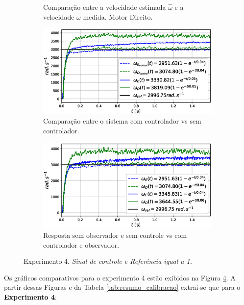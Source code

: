 \begin{figure}[H]
\begin{subfigure}{.5\textwidth}
    \caption{Comparação entre a velocidade estimada $\hat{\omega}$ e a velocidade $\omega$ medida. Motor Direito.}
    \label{fig:exp04:filtragem_direito}
    \end{subfigure}
    \hfill
    \begin{subfigure}{.5\textwidth}
    \centering
    \includegraphics[width=\textwidth]{figuras/resultados/exp04/controlador_vs_sem_controlador100.eps}
    \caption{Comparação entre o sistema com controlador vs sem controlador.}
    \label{fig:exp04:controle}
    \end{subfigure}
    \hfill
    \begin{subfigure}{.5\textwidth}
    \centering
    \includegraphics[width=\textwidth]{figuras/resultados/exp04/antes_vs_depois100.eps}
    \caption{Resposta sem observador e sem controle vs com controlador e observador.}
    \label{fig:exp04:antes_vs_depois}
    \end{subfigure}
    
    \caption{Experimento 4. \emph{Sinal de controle e Referência igual a 1.}}
    \label{fig:exp04_100}
\end{figure}

Os gráficos comparativos para o experimento 4 estão exibidos na Figura \ref{fig:exp04_100}. A partir dessas Figuras e da Tabela \ref{tab:resumo_calibracao} extrai-se que para o \textbf{Experimento 4}:

